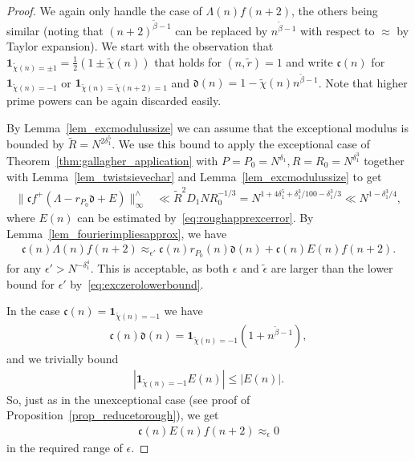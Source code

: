 \documentclass[12pt]{amsart}
\theoremstyle{definition}
\theoremstyle{remark}
\numberwithin{equation}{section}
\newcommand{\1}{\mathbf{1}}
\begin{document}
\begin{proof}
    We again only handle the case of $\Lambda(n)f(n+2)$, the others being similar (noting that $(n+2)^{\widetilde{\beta}-1}$ can be replaced by $n^{\widetilde{\beta}-1}$ with respect to $\approx$ by Taylor expansion). We start with the observation that $\1_{\widetilde{\chi}(n)=\pm 1}=\frac{1}{2}(1\pm \widetilde{\chi}(n))$ that holds for $(n,\widetilde{r})=1$ and write $\mathfrak{c}(n)$ for $\1_{\widetilde{\chi}(n)=-1}$ or $\1_{\widetilde{\chi}(n)=\widetilde{\chi}(n+2)=1}$ and $\mathfrak{d}(n)=1-\widetilde{\chi}(n)n^{\widetilde{\beta}-1}$. Note that higher prime powers can be again discarded easily. 
    
    By Lemma~\ref{lem_excmodulussize} we can assume that the exceptional modulus is bounded by $\widetilde{R}=N^{2\delta_1^5}$. We use this bound to apply the exceptional case of Theorem~\ref{thm:gallagher_application} with $P=P_0=N^{\delta_1}, R=R_0=N^{\delta_1^3}$ together with Lemma~\ref{lem_twistsievechar} and Lemma~\ref{lem_excmodulussize} to get 
    \begin{align*}
         \|\mathfrak{c}f^+(\Lambda - r_{P_0}\mathfrak{d}+E)\|^{\wedge}_\infty &\ll \widetilde{R}^2 D_1  N R_0^{-1/3} =  N^{1+4 \delta_1^5+\delta_1^3/100-\delta_1^3/3} \ll N^{1-\delta_1^3/4},
    \end{align*}
    where $E(n)$ can be estimated by~\eqref{eq:roughapprexcerror}. By Lemma~\ref{lem_fourierimpliesapprox}, we have
    \begin{align*}
        \mathfrak{c}(n)\Lambda(n)f(n+2)\approx_{\epsilon'} \mathfrak{c}(n) r_{P_0}
        (n)\mathfrak{d}(n)+\mathfrak{c}(n)E(n)f(n+2).
    \end{align*}
    for any $\epsilon'>N^{-\delta_1^{4}}$. This is acceptable, as both $\epsilon$ and $\widetilde{\epsilon}$ are larger than the lower bound for $\epsilon'$ by~\eqref{eq:exczerolowerbound}.
    
    In the case $\mathfrak{c}(n)=\1_{\widetilde{\chi}(n)=-1}$ we have
    \begin{align*}
       \mathfrak{c}(n)\mathfrak{d}(n)=\1_{\widetilde{\chi}(n)=-1}(1+n^{\widetilde{\beta}-1}),
    \end{align*}
    and we trivially bound
    \begin{align*}
        |\1_{\widetilde{\chi}(n)=-1}E(n)|\leq |E(n)|.    
    \end{align*}
    So, just as in the unexceptional case (see proof of Proposition~\ref{prop_reducetorough}),  we get
    \begin{align*}
        \mathfrak{c}(n)E(n)f(n+2)\approx_{\epsilon} 0
    \end{align*}
    in the required range of $\epsilon$. 


\end{proof}
\end{document}

